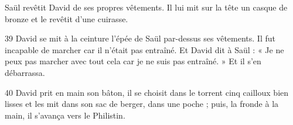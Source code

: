 Saül revêtit David de ses propres vêtements. Il lui mit sur la tête un casque de bronze et le revêtit d’une cuirasse.

39 David se mit à la ceinture l’épée de Saül par-dessus ses vêtements. Il fut incapable de marcher car il n’était pas entraîné. Et David dit à Saül : « Je ne peux pas marcher avec tout cela car je ne suis pas entraîné. » Et il s’en débarrassa.

40 David prit en main son bâton, il se choisit dans le torrent cinq cailloux bien lisses et les mit dans son sac de berger, dans une poche ; puis, la fronde à la main, il s’avança vers le Philistin.
